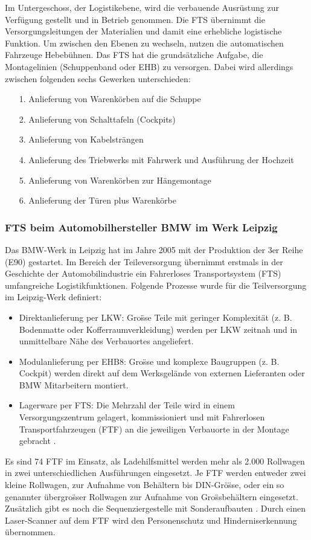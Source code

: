 \begin{itemize}
Im Untergeschoss, der Logistikebene, wird die verbauende Ausr\"ustung zur Verf\"ugung gestellt und in Betrieb genommen.
Die FTS \"ubernimmt die Versorgungsleitungen der Materialien und damit eine erhebliche logistische Funktion.
Um zwischen den Ebenen zu wechseln, nutzen die automatischen Fahrzeuge Hebeb\"uhnen.
Das FTS hat die grunds\"atzliche Aufgabe, die Montagelinien (Schuppenband oder EHB) zu versorgen.
Dabei wird allerdings zwischen folgenden sechs Gewerken unterschieden:
\begin{itemize}
\item[1.] Anlieferung von Warenk\"orben auf die Schuppe
\item[2.] Anlieferung von Schalttafeln (Cockpits)
\item[3.] Anlieferung von Kabelstr\"angen
\item[4.] Anlieferung des Triebwerks mit Fahrwerk und Ausf\"uhrung der Hochzeit
\item[5.] Anlieferung von Warenk\"orben zur H\"angemontage
\item[6.] Anlieferung der T\"uren plus Warenk\"orbe
\end{itemize}
\subsubsection{FTS beim Automobilhersteller BMW im Werk Leipzig}
Das BMW-Werk in Leipzig hat im Jahre 2005 mit der Produktion der 3er Reihe (E90) gestartet.
Im Bereich der Teileversorgung \"ubernimmt erstmals in der Geschichte der Automobilindustrie ein Fahrerloses Transportsystem (FTS) umfangreiche Logistikfunktionen.
Folgende Prozesse wurde f\"ur die Teilversorgung im Leipzig-Werk definiert:

\begin{itemize}
\item Direktanlieferung per LKW: Gro\"sse Teile mit geringer Komplexit\"at (z. B. Bodenmatte oder Kofferraumverkleidung) werden per LKW zeitnah und in unmittelbare N\"ahe des Verbauortes angeliefert.
\item Modulanlieferung per EHB8: Gro\"sse und komplexe Baugruppen (z. B. Cockpit) werden direkt auf dem Werksgel\"ande von externen Lieferanten oder BMW Mitarbeitern montiert.
\item Lagerware per FTS: Die Mehrzahl der Teile wird in einem Versorgungszentrum gelagert, kommissioniert und mit Fahrerlosen Transportfahrzeugen (FTF) an die jeweiligen Verbauorte in der Montage gebracht \cite{Guenther:2011,S.36}.\end{itemize}
Es sind 74 FTF im Einsatz, als Ladehilfsmittel werden mehr als 2.000 Rollwagen in zwei unterschiedlichen Ausf\"uhrungen eingesetzt. Je FTF werden entweder zwei kleine Rollwagen, zur Aufnahme von Beh\"altern bis DIN-Gr\"o\"sse, oder ein so genannter \"ubergro\"sser Rollwagen zur Aufnahme von Gro\"ssbeh\"altern eingesetzt. Zus\"atzlich gibt es noch die Sequenziergestelle mit Sonderaufbauten \cite[S. 37]{Guenther:2011}. Durch einen Laser-Scanner auf dem FTF wird den Personenschutz und Hinderniserkennung \"ubernommen. 


\end{itemize}
